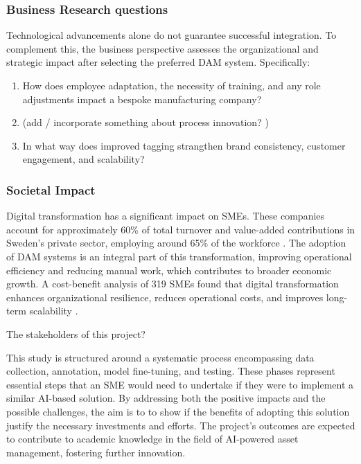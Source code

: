\documentclass[a4paper,10pt,twocolumn]{article}
\numberwithin{figure}{section}
\numberwithin{table}{section}
\begin{document}
\subsubsection{Business Research questions}
\vspace{0.3cm}
Technological advancements alone do not guarantee successful integration. To complement this,
the business perspective assesses the organizational and strategic impact after selecting the preferred DAM system. Specifically:

\begin{enumerate}[label=(\alph*), resume]
    \item How does employee adaptation, the necessity of training, and any role adjustments impact a bespoke manufacturing company? 
    \item (add / incorporate something about process innovation? )
    \item In what way does improved tagging strangthen brand consistency, customer engagement, and scalability?
\end{enumerate}   

\subsubsection{Societal Impact}
\vspace{0.2cm}
Digital transformation has a significant impact on SMEs.
These companies account for approximately 60\% of total turnover and value-added 
contributions in Sweden’s private sector, employing around 65\% of the 
workforce \citep{tillvaxtverket2021}.
The adoption of DAM systems is an integral part of this transformation, 
improving operational efficiency and reducing manual work,
which contributes to broader economic growth. A cost-benefit analysis of 319 SMEs 
found that digital transformation enhances organizational resilience, reduces 
operational costs, and improves long-term scalability \citep{teng2022}.

\vspace{0.3cm}
The stakeholders of this project?

This study is structured around a systematic process 
encompassing data collection, annotation, model fine-tuning, and testing. 
These phases represent essential steps that an SME would need to undertake 
if they were to implement a similar AI-based solution. 
By addressing both the positive impacts and the possible challenges, the aim is to
to show if the benefits of adopting this solution
justify the necessary investments and efforts.
The project’s outcomes are expected to contribute to 
academic knowledge in the field of AI-powered asset management, 
fostering further innovation. 
\end{document}

